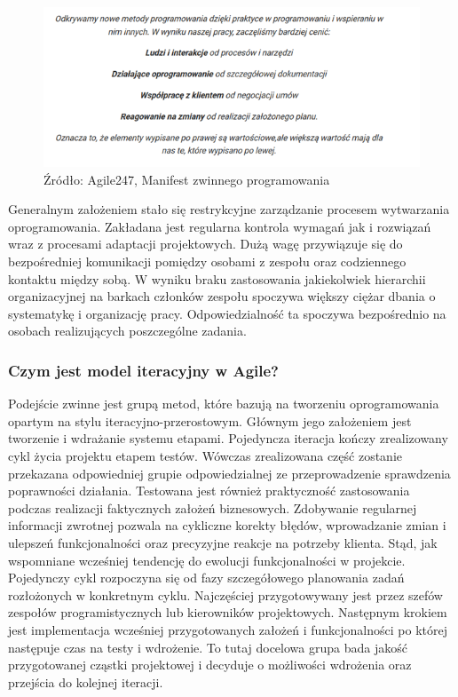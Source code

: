 \documentclass[oneside,polski,logo]{amuthesis}
\begin{document}
\begin{figure}[h]
	\centering
	\includegraphics[width=15cm]{images/hyps/manifest.png}
	\caption{Źródło: Agile247, Manifest zwinnego programowania}
\end{figure}

Generalnym założeniem stało się restrykcyjne zarządzanie procesem wytwarzania oprogramowania. Zakładana jest regularna kontrola wymagań jak i rozwiązań wraz z procesami adaptacji projektowych. Dużą wagę przywiązuje się do bezpośredniej komunikacji pomiędzy osobami z zespołu oraz codziennego kontaktu między sobą. W wyniku braku zastosowania jakiekolwiek hierarchii organizacyjnej na barkach członków zespołu spoczywa większy ciężar dbania o systematykę i organizację pracy. Odpowiedzialność ta spoczywa bezpośrednio na osobach realizujących poszczególne zadania.\\

\subsubsection{Czym jest model iteracyjny w Agile?}
Podejście zwinne jest grupą metod, które bazują na tworzeniu oprogramowania opartym na stylu iteracyjno-przerostowym. Głównym jego założeniem jest tworzenie i wdrażanie systemu etapami. Pojedyncza iteracja kończy zrealizowany cykl życia projektu etapem testów. Wówczas zrealizowana część zostanie przekazana odpowiedniej grupie odpowiedzialnej ze przeprowadzenie sprawdzenia poprawności działania. Testowana jest również praktyczność zastosowania podczas realizacji faktycznych założeń biznesowych. Zdobywanie regularnej informacji zwrotnej pozwala na cykliczne korekty błędów, wprowadzanie zmian i ulepszeń funkcjonalności oraz precyzyjne reakcje na potrzeby klienta. Stąd, jak wspomniane wcześniej tendencję do ewolucji funkcjonalności w projekcie. Pojedynczy cykl rozpoczyna się od fazy szczegółowego planowania zadań rozłożonych w konkretnym cyklu. Najczęściej przygotowywany jest przez szefów zespołów programistycznych lub kierowników projektowych. Następnym krokiem jest implementacja wcześniej przygotowanych założeń i funkcjonalności po której następuje czas na testy i wdrożenie. To tutaj docelowa grupa bada jakość przygotowanej cząstki projektowej i decyduje o możliwości wdrożenia oraz przejścia do kolejnej iteracji.\\
\end{document}
